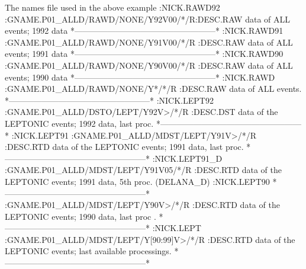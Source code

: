 \begin{XMPt}{The names file used in the above example}
:NICK.RAWD92                                                            
:GNAME.P01_ALLD/RAWD/NONE/Y92V00/*/R:DESC.RAW data of ALL events; 1992 data
*---------------------------------------------------*                   
:NICK.RAWD91                                                            
:GNAME.P01_ALLD/RAWD/NONE/Y91V00/*/R                                    
:DESC.RAW data of ALL events; 1991 data                                 
*---------------------------------------------------*                   
:NICK.RAWD90                                                            
:GNAME.P01_ALLD/RAWD/NONE/Y90V00/*/R                                    
:DESC.RAW data of ALL events; 1990 data                                 
*---------------------------------------------------*                   
:NICK.RAWD                                                              
:GNAME.P01_ALLD/RAWD/NONE/Y*/*/R                                        
:DESC.RAW data of ALL events.                                           
*---------------------------------------------------*                   
:NICK.LEPT92                                                            
:GNAME.P01_ALLD/DSTO/LEPT/Y92V>/*/R                                     
:DESC.DST data of the LEPTONIC events; 1992 data, last proc.            
*---------------------------------------------------*                   
:NICK.LEPT91                                                            
:GNAME.P01_ALLD/MDST/LEPT/Y91V>/*/R                                     
:DESC.RTD data of the LEPTONIC events; 1991 data, last proc.            
*---------------------------------------------------*                   
:NICK.LEPT91_D                                                          
:GNAME.P01_ALLD/MDST/LEPT/Y91V05/*/R                                    
:DESC.RTD data of the LEPTONIC events; 1991 data, 5th proc. (DELANA_D)  
:NICK.LEPT90                                                            
*---------------------------------------------------*                   
:GNAME.P01_ALLD/MDST/LEPT/Y90V>/*/R                                     
:DESC.RTD data of the LEPTONIC events; 1990 data, last proc .           
*---------------------------------------------------*                   
:NICK.LEPT                                                              
:GNAME.P01_ALLD/MDST/LEPT/Y[90:99]V>/*/R                                
:DESC.RTD data of the LEPTONIC events; last available processings.      
*---------------------------------------------------*                   

\end{XMPt}
